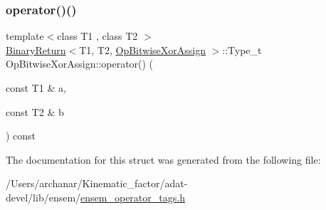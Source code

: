 \subsubsection{\texorpdfstring{operator()()}{operator()()}\hspace{0.1cm}{\footnotesize\ttfamily [3/3]}}
{\footnotesize\ttfamily template$<$class T1 , class T2 $>$ \\
\mbox{\hyperlink{structBinaryReturn}{Binary\+Return}}$<$T1, T2, \mbox{\hyperlink{structOpBitwiseXorAssign}{Op\+Bitwise\+Xor\+Assign}} $>$\+::Type\+\_\+t Op\+Bitwise\+Xor\+Assign\+::operator() (\begin{DoxyParamCaption}\item[{const T1 \&}]{a,  }\item[{const T2 \&}]{b }\end{DoxyParamCaption}) const\hspace{0.3cm}{\ttfamily [inline]}}



The documentation for this struct was generated from the following file\+:\begin{DoxyCompactItemize}
\item 
/\+Users/archanar/\+Kinematic\+\_\+factor/adat-\/devel/lib/ensem/\mbox{\hyperlink{adat-devel_2lib_2ensem_2ensem__operator__tags_8h}{ensem\+\_\+operator\+\_\+tags.\+h}}\end{DoxyCompactItemize}
